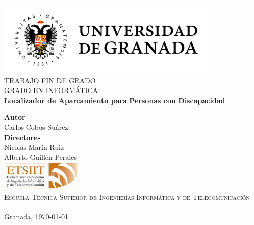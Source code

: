\begin{titlepage}
	
\newlength{\centeroffset}
\setlength{\centeroffset}{-0.5\oddsidemargin}
\addtolength{\centeroffset}{0.5\evensidemargin}
\thispagestyle{empty}

\noindent\hspace*{\centeroffset}
\begin{minipage}{\textwidth}

\centering
\includegraphics[width=0.8\textwidth]{imagenes/logo_ugr.jpg}\\[1.4cm]

\textsc{ \Large TRABAJO FIN DE GRADO\\[0.2cm]}
\textsc{ GRADO EN INFORMÁTICA}\\[1cm]
% 
{\Huge\bfseries Localizador de Aparcamiento para Personas con Discapacidad\\}
\end{minipage}

\vspace{1.5cm}
\noindent\hspace*{\centeroffset}
\begin{minipage}{\textwidth}
\centering

\textbf{Autor}\\ {Carlos Cobos Suárez}\\[2.5ex]
\textbf{Directores}\\
{Nicolás Marín Ruiz\\
Alberto Guillén Perales}\\[2cm]
\includegraphics[width=0.3\textwidth]{imagenes/etsiit_logo.png}\\[0.1cm]
\textsc{Escuela Técnica Superior de Ingenierías Informática y de Telecomunicación}\\
\textsc{---}\\
Granada, \normalsize\today
\end{minipage}
\end{titlepage}


